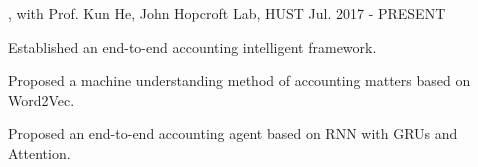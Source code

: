 \begin{cventries}
\cvexperience
{, with Prof. Kun He, John Hopcroft Lab, HUST}
{Jul. 2017 - PRESENT}
{
    \begin{cvitems}
    \item {Established an end-to-end accounting intelligent framework.}
    \item {Proposed a machine understanding method of accounting matters based on Word2Vec.}
    \item {Proposed an end-to-end accounting agent based on RNN with GRUs and Attention.}
    \end{cvitems}
}
\end{cventries}